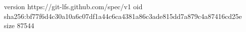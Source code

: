 version https://git-lfs.github.com/spec/v1
oid sha256:bf77f6d4c30a10a6c07df1a44c6ca4381a86c3ade815dd7a879c4a87416cd25e
size 87544
